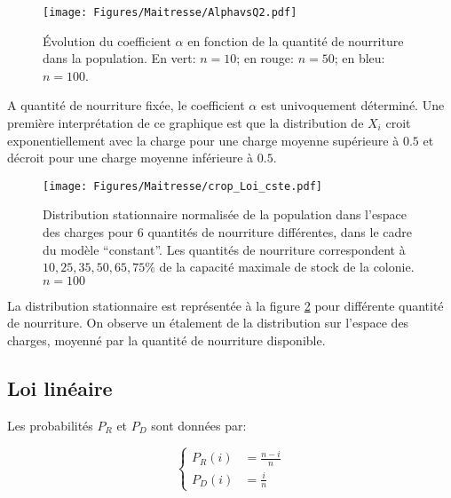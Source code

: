 \begin{figure}[h]
\centering
\texttt{[image: Figures/Maitresse/AlphavsQ2.pdf]}
\caption{Évolution du coefficient $\alpha$ en fonction de la quantité de nourriture dans la population. En vert: $n=10$; en rouge: $n=50$; en bleu: $n=100$.}
\label{AlphavsQCste}
\end{figure}


A quantité de nourriture fixée, le coefficient $\alpha$ est univoquement déterminé. Une première interprétation de ce graphique est que la distribution de $X_i$ croit exponentiellement avec la charge pour une charge moyenne supérieure à $0.5$ et décroit pour une charge moyenne inférieure à $0.5$.\\



\begin{figure}[h]
\centering
\texttt{[image: Figures/Maitresse/crop\_Loi\_cste.pdf]}
\caption{Distribution stationnaire normalisée de la population dans l'espace des charges pour 6 quantités de nourriture différentes, dans le cadre du modèle ``constant''. Les quantités de nourriture correspondent à $10, 25, 35, 50, 65, 75\%$ de la capacité maximale de stock de la colonie. $n=100$}
\label{DistribAnalytiqueCste}
\end{figure}

La distribution stationnaire est représentée à la figure \ref{DistribAnalytiqueCste} pour différente quantité de nourriture. On observe un étalement de la distribution sur l'espace des charges, moyenné par la quantité de nourriture disponible.

\subsection{Loi linéaire}
Les probabilités $P_R$ et $P_D$ sont données par:

\begin{equation}
\left \{
\begin{aligned}
P_R(i) &= \frac{n-i}{n}\\
P_D(i) &= \frac{i}{n}
\end{aligned}
\right.
\end{equation}

